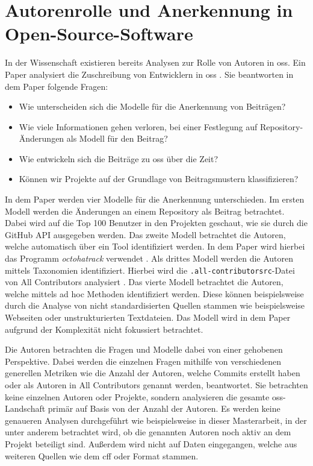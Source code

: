 \section{Autorenrolle und Anerkennung in Open-Source-Software}
\label{sec:autorenrolle-oss}
In der Wissenschaft existieren bereits Analysen zur Rolle von Autoren in \gls{oss}.
Ein Paper analysiert die Zuschreibung von Entwicklern in \gls{oss} \autocite{young_which_2021}.
Sie beantworten in dem Paper folgende Fragen:

\begin{itemize}
  \item Wie unterscheiden sich die Modelle für die Anerkennung von Beiträgen?
  \item Wie viele Informationen gehen verloren, bei einer Festlegung auf Repository-Änderungen als Modell für den Beitrag?
  \item Wie entwickeln sich die Beiträge zu \gls{oss} über die Zeit?
  \item Können wir Projekte auf der Grundlage von Beitragsmustern klassifizieren?
\end{itemize}

In dem Paper werden vier Modelle für die Anerkennung unterschieden.
Im ersten Modell werden die Änderungen an einem Repository als Beitrag betrachtet.
Dabei wird auf die Top 100 Benutzer in den Projekten geschaut, wie sie durch die GitHub API ausgegeben werden.
Das zweite Modell betrachtet die Autoren, welche automatisch über ein Tool identifiziert werden.
In dem Paper wird hierbei das Programm \emph{octohatrack} verwendet \autocites{young_which_2021}{noauthor_labhroctohatrack_2024}.
Als drittes Modell werden die Autoren mittels Taxonomien identifiziert.
Hierbei wird die \texttt{.all-contributorsrc}-Datei von \glqq All Contributors\grqq{} analysiert \autocites{young_which_2021}{all_contributors_recognize_2024}.
Das vierte Modell betrachtet die Autoren, welche mittels ad hoc Methoden identifiziert werden.
Diese können beispielsweise durch die Analyse von nicht standardisierten Quellen stammen wie beispielsweise Webseiten oder unstrukturierten Textdateien.
Das Modell wird in dem Paper aufgrund der Komplexität nicht fokussiert betrachtet.

Die Autoren betrachten die Fragen und Modelle dabei von einer gehobenen Perspektive.
Dabei werden die einzelnen Fragen mithilfe von verschiedenen generellen Metriken wie die Anzahl der Autoren, welche Commits erstellt haben oder als Autoren in \glqq All Contributors\grqq{} genannt werden, beantwortet.
Sie betrachten keine einzelnen Autoren oder Projekte, sondern analysieren die gesamte \gls{oss}-Landschaft primär auf Basis von der Anzahl der Autoren.
Es werden keine genaueren Analysen durchgeführt wie beispielsweise in dieser Masterarbeit, in der unter anderem betrachtet wird, ob die genannten Autoren noch aktiv an dem Projekt beteiligt sind.
Außerdem wird nicht auf Daten eingegangen, welche aus weiteren Quellen wie dem \gls{cff} oder  Format stammen.
